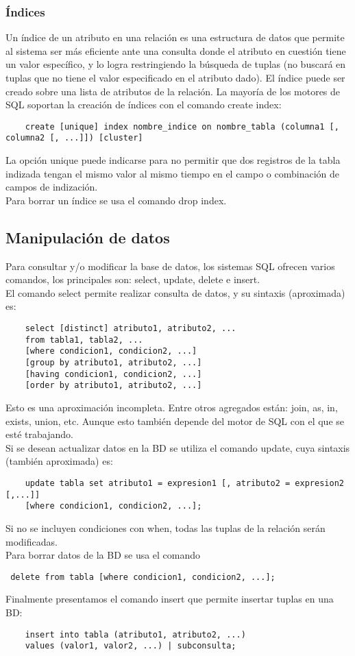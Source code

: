 \documentclass[a4paper]{article}
\begin{document}
\subsubsection*{Índices}
Un índice de un atributo en una relación es una estructura de datos que permite al sistema ser
más eficiente ante una consulta donde el atributo en cuestión tiene un valor específico,
y lo logra restringiendo la búsqueda de tuplas (no buscará en tuplas que no tiene el valor
especificado en el atributo dado). El índice puede ser creado sobre una lista de atributos de
la relación. La mayoría de los motores de SQL soportan la creación de índices con el comando
create index:
\begin{lstlisting}
    create [unique] index nombre_indice on nombre_tabla (columna1 [, columna2 [, ...]]) [cluster]
\end{lstlisting}
La opción unique puede indicarse para no permitir que dos registros de la tabla indizada tengan
el mismo valor al mismo tiempo en el campo o combinación de campos de indización. \\
Para borrar un índice se usa el comando drop index.

\subsection{Manipulación de datos}
Para consultar y/o modificar la base de datos, los sistemas SQL ofrecen varios comandos, los
principales son: select, update, delete e insert.\\
El comando select permite realizar consulta de datos, y su sintaxis (aproximada) es:
\begin{lstlisting}
    select [distinct] atributo1, atributo2, ...
    from tabla1, tabla2, ...
    [where condicion1, condicion2, ...]
    [group by atributo1, atributo2, ...]
    [having condicion1, condicion2, ...]
    [order by atributo1, atributo2, ...]
\end{lstlisting}
Esto es una aproximación incompleta. Entre otros agregados están: join, as, in, exists, union,
etc. Aunque esto también depende del motor de SQL con el que se esté trabajando. \\
Si se desean actualizar datos en la BD se utiliza el comando update, cuya sintaxis (también
aproximada) es:
\begin{lstlisting}
    update tabla set atributo1 = expresion1 [, atributo2 = expresion2 [,...]]
    [where condicion1, condicion2, ...];
\end{lstlisting}
Si no se incluyen condiciones con when, todas las tuplas de la relación serán modificadas.\\
Para borrar datos de la BD se usa el comando
\begin{lstlisting} delete from tabla [where condicion1, condicion2, ...]; \end{lstlisting}
Finalmente presentamos el comando insert que permite insertar tuplas en una BD:
\begin{lstlisting}
    insert into tabla (atributo1, atributo2, ...)
    values (valor1, valor2, ...) | subconsulta;
\end{lstlisting}
\end{document}
